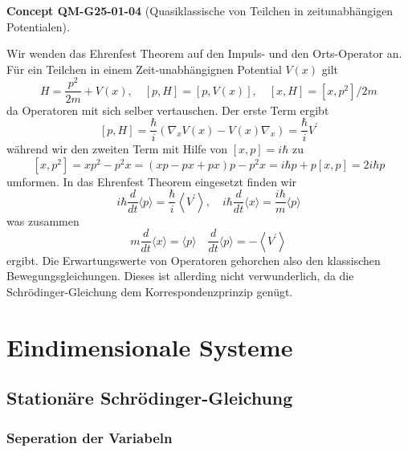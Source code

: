 \documentclass[10pt, letterpaper]{article}
\newcommand{\CustomHeading}[3]{%
  \par\medskip\noindent%
  \textbf{#1 #2} \textnormal{(#3)}.\enskip%
}
\newenvironment{CONC}[2]{\begin{unitbox}\CustomHeading{Concept}{#1}{#2}}{\end{unitbox}}
\begin{document}
\begin{CONC}{QM-G25-01-04}{Quasiklassische von Teilchen in zeitunabhängigen Potentialen}
Wir wenden das Ehrenfest Theorem auf den Impuls- und den Orts-Operator an. Für ein Teilchen in einem Zeit-unabhängignen Potential $V(x)$ gilt
$$
H=\frac{p^{2}}{2 m}+V(x), \quad[p, H]=[p, V(x)], \quad[x, H]=\left[x, p^{2}\right] / 2 m
$$
da Operatoren mit sich selber vertauschen. Der erste Term ergibt
$$
[p, H]=\frac{\hbar}{i}\left(\nabla_{x} V(x)-V(x) \nabla_{x}\right)=\frac{\hbar}{i} V^{\prime}
$$
während wir den zweiten Term mit Hilfe von $[x, p]=i \hbar$ zu
$$
\left[x, p^{2}\right]=x p^{2}-p^{2} x=(x p-p x+p x) p-p^{2} x=i \hbar p+p[x, p]=2 i \hbar p
$$
umformen. In das Ehrenfest Theorem eingesetzt finden wir
$$
i \hbar \frac{d}{d t}\langle p\rangle=\frac{\hbar}{i}\left\langle V^{\prime}\right\rangle, \quad i \hbar \frac{d}{d t}\langle x\rangle=\frac{i \hbar}{m}\langle p\rangle
$$
was zusammen
$$
m \frac{d}{d t}\langle x\rangle=\langle p\rangle \quad \frac{d}{d t}\langle p\rangle=-\left\langle V^{\prime}\right\rangle
$$
ergibt. Die Erwartungswerte von Operatoren gehorchen also den klassischen Bewegungsgleichungen. Dieses ist allerding nicht verwunderlich, da die Schrödinger-Gleichung dem Korrespondenzprinzip genügt.
\end{CONC}














\pagebreak


\section{Eindimensionale Systeme}




\subsection{Stationäre Schrödinger-Gleichung}


\subsubsection*{Seperation der Variabeln}
\end{document}
